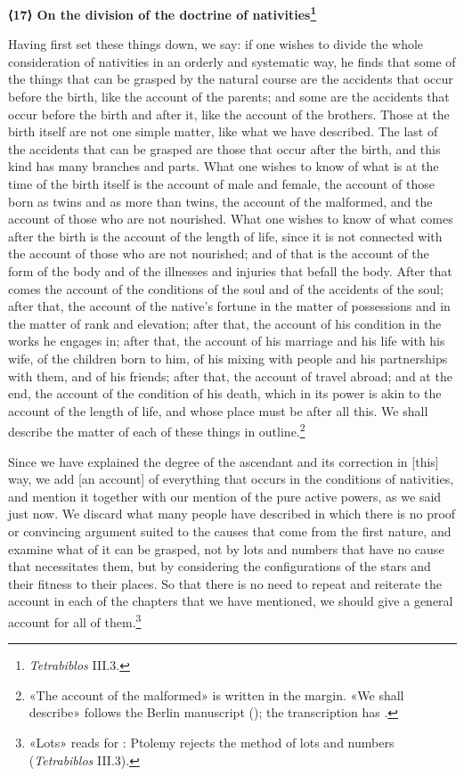 \documentclass[11pt]{article}
\newcommand{\Fol}[1]{\marginpar{\footnotesize\color{gray}f.\,#1}}
\newcommand{\ChapterHead}[4]{\par\needspace{8\baselineskip}\bigskip\pdfbookmark[1]{#1}{ch-#2}\hypertarget{EN-K#2}{}%
 {\large\bfseries\interlinepenalty=10000 #1#4{\normalfont\normalsize#3}\par}\nobreak\medskip}
\begin{document}
\ChapterHead{{\mdseries ⟨}17{\mdseries ⟩} On the division of the doctrine of nativities}{17}{}{\footnote{\emph{Tetrabiblos} III.3.}}
\par \Fol{36r}Having first set these things down, we say: if one wishes to divide the whole consideration of nativities in an orderly and systematic way, he finds that some of the things that can be grasped by the natural course are the accidents that occur before the birth, like the account of the parents; and some are the accidents that occur before the birth and after it, like the account of the brothers. Those at the birth itself are not one simple matter, like what we have described. The last of the accidents that can be grasped are those that occur after the birth, and this kind has many branches and parts. What one wishes to know of what is at the time of the birth itself is the account of male and female, the account of those born as twins and as more than twins, the account of the malformed, and the account of those who are not nourished. What one wishes to know of what comes after the birth is the account of the length of life, since it is not connected with the account of those who are not nourished; and of that is the account of the form of the body and of the illnesses and injuries that befall the body. After that comes the account of the conditions of the soul and of the accidents of the soul; after that, the account of the native's fortune in the matter of possessions and in the matter of rank and elevation; after that, the account of his condition in the works he engages in; after that, the account of his marriage and his life with his wife, of the children born to him, of his mixing with people and his partnerships with them, and of his friends; after that, the account of travel abroad; and at the end, the account of the condition of his death, which in its power is akin to the account of the length of life, and whose place must be after all this. We shall describe the matter of each of these things in outline.\footnote{«The account of the malformed» is written in the margin. «We shall describe» follows the Berlin manuscript (); the transcription has .}\par
\par Since we have explained the degree of the ascendant and its correction in [this] way, we add [an account] of everything that occurs in the conditions of nativities, and mention it together with our mention of the pure active powers, as we said just now. We discard what many people have described in which there is no proof or convincing argument suited to the causes that come from the first nature, and examine what of it can be grasped, not by lots and numbers that have no cause that necessitates them, but by considering the configurations of the stars and their fitness to their places. So that there is no need to repeat and reiterate the account in each of the chapters that we have mentioned, we should give a general account for all of them.\footnote{«Lots» reads  for : Ptolemy rejects the method of lots and numbers (\emph{Tetrabiblos} III.3).}\par
\end{document}
